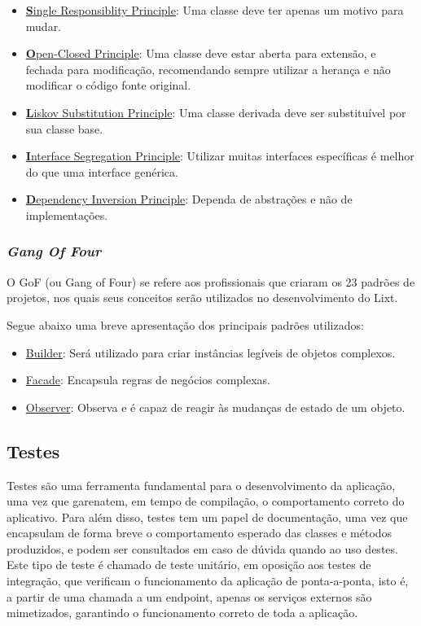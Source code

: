 \begin{itemize}
	\item \underline{\textbf{S}ingle Responsiblity Principle}: Uma classe deve ter apenas um motivo para mudar.
	\item \underline{\textbf{O}pen-Closed Principle}: Uma classe deve estar aberta para extensão, e fechada para modificação, recomendando sempre utilizar a herança e não modificar o código fonte original.
	\item \underline{\textbf{L}iskov Substitution Principle}: Uma classe derivada deve ser substituível por sua classe base.
	\item \underline{\textbf{I}nterface Segregation Principle}: Utilizar muitas interfaces específicas é melhor do que uma interface genérica.
	\item \underline{\textbf{D}ependency Inversion Principle}: Dependa de abstrações e não de implementações.
\end{itemize}

\subsubsection{\emph{Gang Of Four}}

O GoF (ou Gang of Four) se refere aos profissionais que criaram os 23 padrões de projetos, nos quais seus conceitos serão utilizados no desenvolvimento do Lixt.

Segue abaixo uma breve apresentação dos principais padrões utilizados:

\begin{itemize}
	\item \underline{Builder}: Será utilizado para criar instâncias legíveis de objetos complexos.
	\item \underline{Facade}: Encapsula regras de negócios complexas.
	\item \underline{Observer}: Observa e é capaz de reagir às mudanças de estado de um objeto.
\end{itemize}

\subsection{Testes}

Testes são uma ferramenta fundamental para o desenvolvimento da
aplicação, uma vez que garenatem, em tempo de compilação, o
comportamento correto do aplicativo. Para além disso, testes tem um
papel de documentação, uma vez que encapsulam de forma breve o
comportamento esperado das classes e métodos produzidos, e podem ser
consultados em caso de dúvida quando ao uso destes. Este tipo de teste
é chamado de teste unitário, em oposição aos testes de integração, que
verificam o funcionamento da aplicação de ponta-a-ponta, isto é, a
partir de uma chamada a um endpoint, apenas os serviços externos são
mimetizados, garantindo o funcionamento correto de toda a aplicação.


